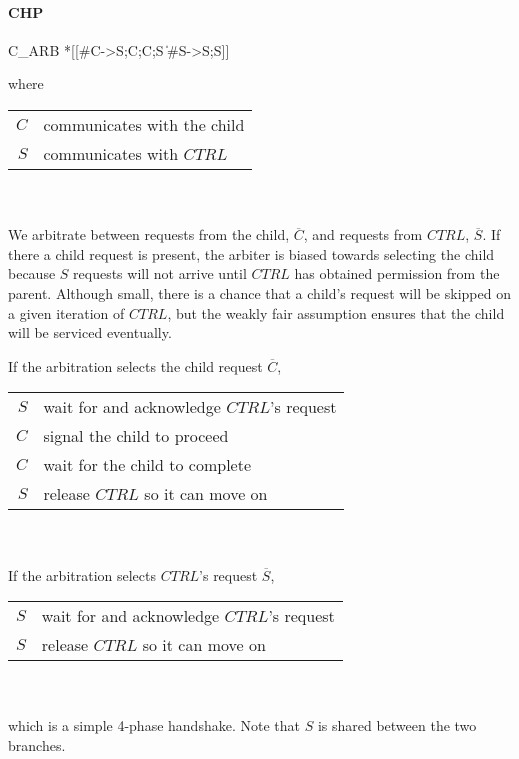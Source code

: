 \documentclass[aer.tex]{subfiles}
\begin{document}
\paragraph{CHP}

\begin{csp}
C_ARB\equiv
  *[[#C->S;C;C;S
    \|#S->S;S]]
\end{csp}

\noindent where 

\begin{tabular}[]{rl}
  $C$ & communicates with the child \\ 
  $S$ & communicates with $CTRL$ \\
\end{tabular} \\ \\

We arbitrate between requests from the child, $\overline{C}$, and 
requests from $CTRL$, $\overline{S}$. If there a child request is present, the arbiter is biased towards selecting the child because $S$ requests will not arrive until $CTRL$ has obtained permission from the parent. Although small, there is a chance that a child's request will be skipped on a given iteration of $CTRL$, but the weakly fair assumption ensures that the child will be serviced eventually.

\noindent If the arbitration selects the child request $\overline{C}$, 

\begin{tabular}[]{rl}
  $S$ & wait for and acknowledge $CTRL$'s request \\
  $C$ & signal the child to proceed \\
  $C$ & wait for the child to complete \\
  $S$ & release $CTRL$ so it can move on \\
\end{tabular} \\ \\

\noindent If the arbitration selects $CTRL$'s request $\overline{S}$,

\begin{tabular}[]{rl}
  $S$ & wait for and acknowledge $CTRL$'s request \\
  $S$ & release $CTRL$ so it can move on \\
\end{tabular} \\ \\

\noindent which is a simple 4-phase handshake. Note that $S$ is shared between the two branches.
\end{document}
